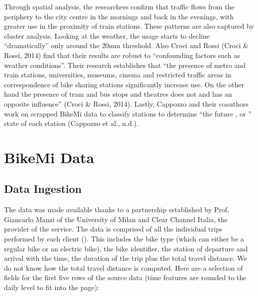 \documentclass[letterpaper,10pt,english]{jupyterBook}
\begin{document}
\sphinxAtStartPar
Through spatial analysis, the researchers confirm that traffic flows from the periphery to the city centre in the mornings and back in the evenings, with greater use in the proximity of train stations. These patterns are also captured by cluster analysis. Looking at the weather, the usage starts to decline “dramatically” only around the 20mm threshold. Also Croci and Rossi (Croci \& Rossi, 2014) find that their results are robust to “confounding factors such as weather conditions”. Their research establishes that “the presence of metro and train stations, universities, museums, cinema and restricted traffic areas in correspondence of bike sharing stations significantly increase use. On the other hand the presence of tram and bus stops and theatres does not and has an opposite influence” (Croci \& Rossi, 2014). Lastly, Cappozzo and their coauthors work on scrapped BikeMi data to classify stations to determine “the future ,  or ” state of each station (Cappozzo et al., n.d.).


\chapter{BikeMi Data}
\label{\detokenize{03-data_ingestion_and_spatial_operations:bikemi-data}}\label{\detokenize{03-data_ingestion_and_spatial_operations::doc}}

\section{Data Ingestion}
\label{\detokenize{03-data_ingestion_and_spatial_operations:data-ingestion}}
\sphinxAtStartPar
The data was made available thanks to a partnership established by Prof. Giancarlo Manzi of the University of Milan and Clear Channel Italia, the provider of the service. The data is comprised of all the individual trips performed by each client (). This includes the bike type (which can either be a regular bike or an electric bike), the bike identifier, the station of departure and arrival with the time, the duration of the trip  plus the total travel distance. We do not know how the total travel distance  is computed. Here are a selection of fields for the first five rows of the source data (time features are rounded to the daily level to fit into the page):
\end{document}
